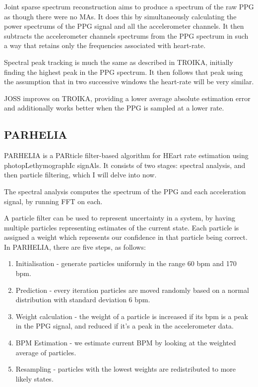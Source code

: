 \documentclass[12pt,a4paper,twoside,openright]{report}
\begin{document}
Joint sparse spectrum reconstruction aims to produce a spectrum of the raw PPG
as though there were no MAs. It does this by simultaneously calculating the
power spectrums of the PPG signal and all the accelerometer channels. It then
subtracts the accelerometer channels spectrums from the PPG spectrum in such a
way that retains only the frequencies associated with heart-rate.

Spectral peak tracking is much the same as described in TROIKA, initially
finding the highest peak in the PPG spectrum. It then follows that peak using
the assumption that in two successive windows the heart-rate will be very
similar.

JOSS improves on TROIKA, providing a lower average absolute estimation error
and additionally works better when the PPG is sampled at a lower rate.


\subsection{PARHELIA}

PARHELIA \cite{Fujita18} is a PARticle filter-based algorithm for HEart rate
estimation using photopLethymographIc signAls. It consists of two stages:
spectral analysis, and then particle filtering, which I will delve into now.

The spectral analysis computes the spectrum of the PPG and each acceleration
signal, by running FFT on each. 

A particle filter can be used to represent uncertainty in a system, by having
multiple particles representing estimates of the current state. Each particle
is assigned a weight which represents our confidence in that particle being
correct. In PARHELIA, there are five steps, as follows:
\begin{enumerate}
	\item Initialisation - generate particles uniformly in the range 60
		bpm and 170 bpm.

	\item Prediction - every iteration particles are moved randomly based on a normal
		distribution with standard deviation 6 bpm.

	\item Weight calculation - the weight of a particle is increased if
		its bpm is a peak in the PPG signal, and reduced if it's a
		peak in the accelerometer data.

	\item BPM Estimation - we estimate current BPM by looking at the
		weighted average of particles.

	\item Resampling - particles with the lowest weights are redistributed
		to more likely states.
\end{enumerate}
\end{document}
